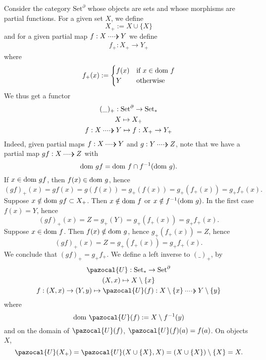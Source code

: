 \begin{example}
    Consider the category $\mathrm{Set}^\partial$ whose objects are sets and whose morphisms are partial functions. For a given set $X$, we define 
    $$
        X_{+} := X\cup \{X\}
    $$
    and for a given partial map $f : X\dottedarrow Y$ we define 
    \begin{gather*}
        f_{+} : X_{+} \rightarrow Y_{+}
    \end{gather*}
    where 
    $$
        f_{+}(x) := 
        \begin{cases}
            f(x) & \text{if } x\in \mathrm{dom}\ f\\
            Y & \text{otherwise}
        \end{cases}
    $$
    We thus get a functor
    \begin{gather*}
        (\_)_{+} : \mathrm{Set}^\partial \rightarrow \mathrm{Set}_\ast\\
        X \mapsto X_{+}\\
        f : X \dottedarrow Y \mapsto f : X_{+}\rightarrow Y_{+}
    \end{gather*}
    Indeed, given partial maps $f: X\dottedarrow Y$ and $g : Y \dottedarrow Z$, note that we have a partial map $gf : X\dottedarrow Z$ with 
    $$\dom \ gf = \dom \ f \cap f^{-1}(\dom\ g).$$
    If $x\in \mathrm{dom} \ gf$, then $f(x)\in \mathrm{dom} \ g$, hence 
    $$
        (gf)_{+}(x)= gf(x) = g(f(x)) = g_{+}(f(x))= g_{+}(f_{+}(x))=g_{+}f_{+}(x).
    $$ 
    Suppose $x\notin \mathrm{dom} \ gf \subset X_{+}$. Then $x\notin \mathrm{dom}\ f$ or $x\notin f^{-1}(\mathrm{dom} \ g)$. In the first case $f(x)=Y$, hence
    $$
        (gf)_{+}(x) = Z = g_{+}(Y)=g_{+}(f_{+}(x))= g_{+}f_{+}(x). 
    $$
    Suppose $x\in \mathrm{dom} \ f$. Then  $f(x)\notin \mathrm{dom} \ g$, hence $g_{+}(f_{+} (x)) = Z$, hence 
    $$
        (gf)_{+}(x) = Z = g_{+}(f_{+}(x)) = g_{+}f_{+}(x).   
    $$
    We conclude that $(gf)_{+} = g_{+}f_{+}$. We define a left inverse to $(\_)_{+}$, by 
    \begin{gather*}
        \pazocal{U} : \mathrm{Set}_\ast \rightarrow \mathrm{Set}^\partial\\
        (X,x)\mapsto X\setminus \{x\}\\
        f : (X,x)\rightarrow (Y,y) \mapsto \pazocal{U}(f) : X\setminus\{x\} \dottedarrow Y\setminus \{y\}
    \end{gather*}
    where 
    $$\dom \ \pazocal{U}(f) := X\setminus f^{-1}(y)$$
    and on the domain of $\pazocal{U}(f)$, $\pazocal{U}(f)(a) = f(a)$. On objects $X$,
    $$
        \pazocal{U}(X_{+})=\pazocal{U}(X\cup\{X\},X) = (X\cup\{X\})\setminus\{X\} = X.
$$
\end{example}
